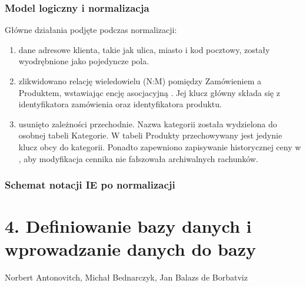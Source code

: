 \documentclass[letterpaper,10pt,polish]{sphinxmanual}
\begin{document}
\subsection{Model logiczny i normalizacja}
\label{\detokenize{rozdzial_3/index:model-logiczny-i-normalizacja}}
\sphinxAtStartPar
Główne działania podjęte podczas normalizacji:
\begin{enumerate}
%
\item {} 
\sphinxAtStartPar
{} dane adresowe klienta, takie jak ulica, miasto i kod pocztowy, zostały wyodrębnione jako pojedyncze pola.

\item {} 
\sphinxAtStartPar
{} zlikwidowano relację wiele\sphinxhyphen{}do\sphinxhyphen{}wielu (N:M) pomiędzy Zamówieniem a Produktem, wstawiając encję asocjacyjną . Jej klucz główny składa się z identyfikatora zamówienia oraz identyfikatora produktu.

\item {} 
\sphinxAtStartPar
{} usunięto zależności przechodnie. Nazwa kategorii została wydzielona do osobnej tabeli Kategorie. W tabeli Produkty przechowywany jest jedynie klucz obcy do kategorii. Ponadto zapewniono zapisywanie historycznej ceny w , aby modyfikacja cennika nie fałszowała archiwalnych rachunków.

\end{enumerate}


\subsection{Schemat notacji IE po normalizacji}
\label{\detokenize{rozdzial_3/index:schemat-notacji-ie-po-normalizacji}}\begin{quote}

\noindent{}
\end{quote}

\sphinxstepscope


\chapter{4. Definiowanie bazy danych i wprowadzanie danych do bazy}
\label{\detokenize{rozdzial_4/index:definiowanie-bazy-danych-i-wprowadzanie-danych-do-bazy}}\label{\detokenize{rozdzial_4/index::doc}}
\sphinxAtStartPar
{} Norbert Antonovitch, Michał Bednarczyk, Jan Balazs de Borbatviz
\end{document}
